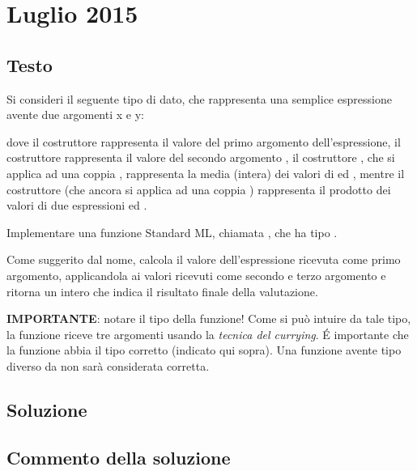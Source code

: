 \section{Luglio 2015}

\subsection{Testo}

Si consideri il seguente tipo di dato, che rappresenta una semplice espressione avente due argomenti x e y:


dove il costruttore  rappresenta il valore del primo argomento  dell'espressione, %
il costruttore  rappresenta il valore del secondo argomento , %
il costruttore , che si applica ad una coppia , rappresenta la media (intera) dei valori di  ed , %
mentre il costruttore  (che ancora si applica ad una coppia ) rappresenta il prodotto dei valori di due espressioni  ed .

\medskip
Implementare una funzione Standard ML, chiamata , che ha tipo .

\medskip
Come suggerito dal nome,  calcola il valore dell'espressione ricevuta come primo argomento, applicandola ai valori ricevuti come secondo e terzo argomento e ritorna un intero che indica il risultato finale della valutazione.

\medskip
\textbf{IMPORTANTE}: notare il tipo della funzione! Come si può intuire da tale tipo, la funzione riceve tre argomenti usando la \emph{tecnica del currying}. \'E importante che la funzione abbia il tipo corretto (indicato qui sopra). Una funzione avente tipo diverso da  non sarà considerata corretta.

\subsection{Soluzione}



\subsection{Commento della soluzione}

